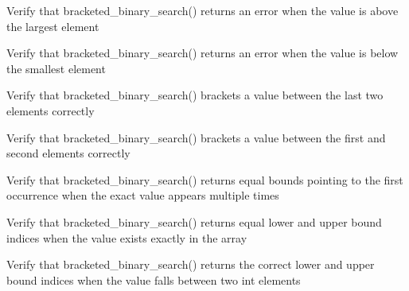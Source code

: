 \begin{DoxyRefList}
%
Verify that bracketed\+\_\+binary\+\_\+search() returns an error when the value is above the largest element  
\item[Global \doxylink{test__array_8cpp_a9d1151c5f79bd7fd5be36874b13cd509}{TEST\+\_\+F} (\doxylink{classArrayInitTest}{Array\+Init\+Test}, Bracketed\+Binary\+Search\+Int\+Below\+Range\+Returns\+Error)]\label{test__test000204}%
%
Verify that bracketed\+\_\+binary\+\_\+search() returns an error when the value is below the smallest element  
\item[Global \doxylink{test__array_8cpp_ae729d86d3a336200ecc306a3b382d1fc}{TEST\+\_\+F} (\doxylink{classArrayInitTest}{Array\+Init\+Test}, Bracketed\+Binary\+Search\+Int\+Value\+Near\+Back)]\label{test__test000203}%
%
Verify that bracketed\+\_\+binary\+\_\+search() brackets a value between the last two elements correctly  
\item[Global \doxylink{test__array_8cpp_aed8580a9acf949770a4acece843ec9a3}{TEST\+\_\+F} (\doxylink{classArrayInitTest}{Array\+Init\+Test}, Bracketed\+Binary\+Search\+Int\+Value\+Near\+Front)]\label{test__test000202}%
%
Verify that bracketed\+\_\+binary\+\_\+search() brackets a value between the first and second elements correctly  
\item[Global \doxylink{test__array_8cpp_aae51d323e51a37022643d21b34995b2a}{TEST\+\_\+F} (\doxylink{classArrayInitTest}{Array\+Init\+Test}, Bracketed\+Binary\+Search\+Int\+Exact\+Match\+Duplicates)]\label{test__test000201}%
%
Verify that bracketed\+\_\+binary\+\_\+search() returns equal bounds pointing to the first occurrence when the exact value appears multiple times  
\item[Global \doxylink{test__array_8cpp_a1ee13272993005432ca8ed11d60d105a}{TEST\+\_\+F} (\doxylink{classArrayInitTest}{Array\+Init\+Test}, Bracketed\+Binary\+Search\+Int\+Exact\+Match)]\label{test__test000200}%
%
Verify that bracketed\+\_\+binary\+\_\+search() returns equal lower and upper bound indices when the value exists exactly in the array  
\item[Global \doxylink{test__array_8cpp_a06cb9ec26eef60605c03397a37df4f31}{TEST\+\_\+F} (\doxylink{classArrayInitTest}{Array\+Init\+Test}, Bracketed\+Binary\+Search\+Int\+Value\+Between\+Elements)]\label{test__test000199}%
%
Verify that bracketed\+\_\+binary\+\_\+search() returns the correct lower and upper bound indices when the value falls between two int elements  

\end{DoxyRefList}
